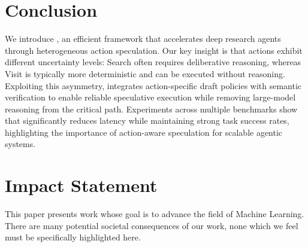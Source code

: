 \section{Conclusion}

We introduce \method{}, an efficient framework that accelerates deep research agents through heterogeneous action speculation.
Our key insight is that actions exhibit different uncertainty levels: Search often requires deliberative reasoning, whereas Visit is typically more deterministic and can be executed without reasoning.
Exploiting this asymmetry, \method{} integrates action-specific draft policies with semantic verification to enable reliable speculative execution while removing large-model reasoning from the critical path.
Experiments across multiple benchmarks show that \method{} significantly reduces latency while maintaining strong task success rates, highlighting the importance of action-aware speculation for scalable agentic systems.


\section*{Impact Statement}
This paper presents work whose goal is to advance the field of Machine Learning. There are many potential societal consequences of our work, none which we feel must be specifically highlighted here.